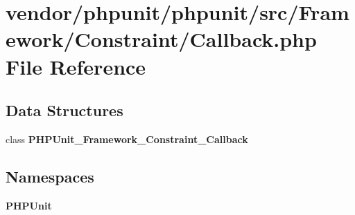 \section{vendor/phpunit/phpunit/src/\+Framework/\+Constraint/\+Callback.php File Reference}
\label{_callback_8php}
\subsection*{Data Structures}
\begin{DoxyCompactItemize}
\item 
class {\bf P\+H\+P\+Unit\+\_\+\+Framework\+\_\+\+Constraint\+\_\+\+Callback}
\end{DoxyCompactItemize}
\subsection*{Namespaces}
\begin{DoxyCompactItemize}
\item 
 {\bf P\+H\+P\+Unit}
\end{DoxyCompactItemize}
